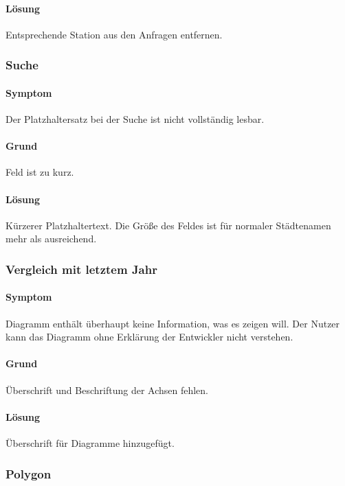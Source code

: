 \paragraph{Lösung}
Entsprechende Station aus den Anfragen entfernen.

\subsubsection{Suche}
\paragraph{Symptom}
Der Platzhaltersatz bei der Suche ist nicht vollständig lesbar.

\paragraph{Grund}
Feld  ist zu kurz.

\paragraph{Lösung}
Kürzerer Platzhaltertext. Die Größe des Feldes ist für normaler Städtenamen mehr als ausreichend.

\subsubsection{Vergleich mit letztem Jahr}
\paragraph{Symptom}

Diagramm enthält überhaupt keine Information, was es zeigen will. Der Nutzer kann das Diagramm ohne Erklärung der Entwickler nicht verstehen.


\paragraph{Grund}
Überschrift und Beschriftung der Achsen fehlen.

\paragraph{Lösung}
Überschrift für Diagramme hinzugefügt.

\subsubsection{Polygon}
